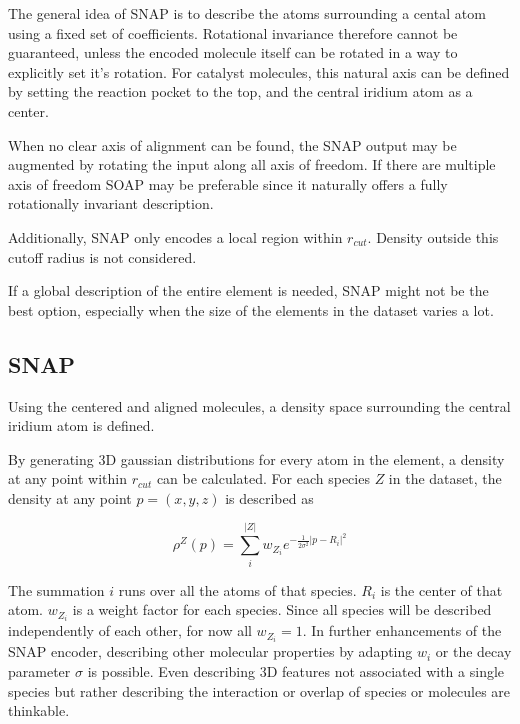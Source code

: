 The general idea of SNAP is to describe the atoms surrounding a cental atom using a fixed set of coefficients.
Rotational invariance therefore cannot be guaranteed, unless the encoded molecule itself can be rotated in a way to explicitly set it's rotation.
For catalyst molecules, this natural axis can be defined by setting the reaction pocket to the top, and the central iridium atom as a center.


When no clear axis of alignment can be found, the SNAP output may be augmented by rotating the input along all axis of freedom.
If there are multiple axis of freedom SOAP may be preferable since it naturally offers a fully rotationally invariant description.

Additionally, SNAP only encodes a local region within $r_{cut}$.
Density outside this cutoff radius is not considered.

If a global description of the entire element is needed, SNAP might not be the best option, especially when 
the size of the elements in the dataset varies a lot.

\subsection{SNAP}

Using the centered and aligned molecules, a density space surrounding the central iridium atom is defined.

By generating 3D gaussian distributions for every atom in the element, a density at any point within $r_{cut}$ can be calculated.
For each species $Z$ in the dataset, the density at any point $p = (x,y,z)$ is described as

$$\rho^Z(p) = \sum_i^{|Z|} w_{Z_i} e^{- \frac{1}{2\sigma^2} \vert p - R_i \vert^2 }$$  %

The summation $i$ runs over all the atoms of that species.
$R_i$ is the center of that atom.
$w_{Z_i}$ is a weight factor for each species. 
Since all species will be described independently of each other, for now all $w_{Z_i}=1$.
In further enhancements of the SNAP encoder, describing other molecular properties by adapting $w_{i}$ or the decay parameter $\sigma$ is possible.
Even describing 3D features not associated with a single species but rather describing the interaction or overlap of species 
or molecules are thinkable.

